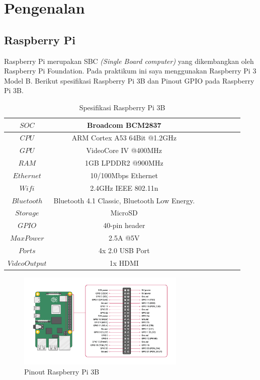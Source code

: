 \documentclass{class}
\begin{document}
\cover
    \chapter{Pengenalan}
    \section{Raspberry Pi}
    Raspberry Pi merupakan SBC \emph{(Single Board computer)} yang dikembangkan oleh Raspberry Pi Foundation.
    Pada praktikum ini saya menggunakan Raspberry Pi 3 Model B. Berikut spesifikasi Raspberry Pi 3B dan Pinout GPIO pada Raspberry Pi 3B. \\
    \begin{table}[h!]
      \begin{tabular}{|c|c|c|c|c|c|c|c|}
          \hline
          $SOC$ & Broadcom BCM2837 \\ \hline
          $CPU$ & ARM Cortex A53 64Bit @1.2GHz \\ \hline
          $GPU$ & VideoCore IV @400MHz\\ \hline
          $RAM$ & 1GB LPDDR2 @900MHz\\ \hline
          $Ethernet$ & 10/100Mbps Ethernet\\ \hline
          $Wifi$ & 2.4GHz IEEE 802.11n\\ \hline
          $Bluetooth$ & Bluetooth 4.1 Classic, Bluetooth Low Energy.\\ \hline
          $Storage$ & MicroSD\\ \hline
          $GPIO$ & 40-pin header\\ \hline
          $Max Power$ & 2.5A @5V\\ \hline
          $Ports$ & 4x 2.0 USB Port\\ \hline
          $Video Output$ & 1x HDMI\\ \hline
      \end{tabular}
      \caption{Spesifikasi Raspberry Pi 3B}
  \end{table}
  \begin{figure}[H]
    \centering
        \includegraphics[width=8cm]{gambar/GPIO-Pinout-Diagram-2.png}
        \caption{Pinout Raspberry Pi 3B}
        \label{pinout}
\end{figure}
\end{document}
